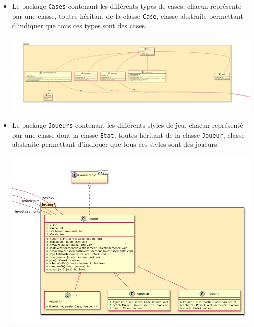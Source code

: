 \documentclass[11pt, a4paper]{report}
\begin{document}
	\begin{itemize}
		\item Le package \verb|Cases| contenant les différents types de cases, chacun représenté par une classe, toutes héritant de la classe \verb|Case|, classe abstraite permettant d'indiquer que tous ces types sont des cases.\\
		\begin{center}
			\includegraphics[width=1\textwidth]{images/UMLCases.png}\\
		\end{center}
		
		\item Le package \verb|Joueurs| contenant les différents styles de jeu, chacun représenté par une classe dont la classe \verb|Etat|, toutes héritant de la classe \verb|Joueur|, classe abstraite permettant d'indiquer que tous ces styles sont des joueurs.\\
		\begin{center}
			\includegraphics[width=1\textwidth]{images/UMLJoueurs.png}\\
		\end{center}
		
		\pagebreak
		

\end{itemize}
\end{document}
